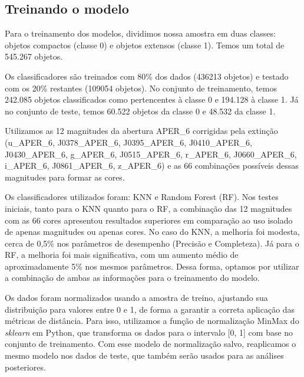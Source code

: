 \subsection{Treinando o modelo}\label{subsec:treinando_modelo}

Para o treinamento dos modelos, dividimos nossa amostra em duas classes: objetos compactos (classe 0) e objetos extensos (classe 1). Temos um total de 545.267 objetos.

Os classificadores são treinados com 80\% dos dados (436213 objetos) e testado com os 20\% restantes (109054 objetos).
No conjunto de treinamento, temos 242.085 objetos classificados como pertencentes à classe 0 e 194.128 à classe 1. Já no conjunto de teste, temos 60.522 objetos da classe 0 e 48.532 da classe 1.

\raggedright
Utilizamos as 12 magnitudes da abertura APER\_6 corrigidas pela extinção (u\_APER\_6, J0378\_APER\_6, J0395\_APER\_6, J0410\_APER\_6, J0430\_APER\_6, g\_APER\_6, J0515\_APER\_6, r\_APER\_6, J0660\_APER\_6, i\_APER\_6, J0861\_APER\_6, z\_APER\_6) e as 66 combinações possíveis dessas magnitudes para formar as cores.

Os classificadores utilizados foram: \ac{KNN} e Random Forest (RF). Nos testes iniciais, tanto para o \ac{KNN} quanto para o RF, a combinação das 12 magnitudes com as 66 cores apresentou resultados superiores em comparação ao uso isolado de apenas magnitudes ou apenas cores. No caso do KNN, a melhoria foi modesta, cerca de 0,5\% nos parâmetros de desempenho (Precisão e Completeza). Já para o RF, a melhoria foi mais significativa, com um aumento médio de aproximadamente 5\% nos mesmos parâmetros. Dessa forma, optamos por utilizar a combinação de ambas as informações para o treinamento do modelo.

Os dados foram normalizados usando a amostra de treino, ajustando sua distribuição para valores entre 0 e 1, de forma a garantir a correta aplicação das métricas de distância. Para isso, utilizamos a função de normalização MinMax do \textit{sklearn} em Python, que transforma os dados para o intervalo [0, 1] com base no conjunto de treinamento. Com esse modelo de normalização salvo, reaplicamos o mesmo modelo nos dados de teste, que também serão usados para as análises posteriores.

